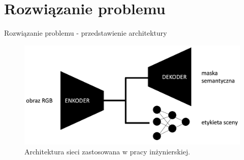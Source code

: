\documentclass[10pt]{beamer}
\begin{document}
\section*{Rozwiązanie problemu}
\begin{frame}{Rozwiązanie problemu - przedstawienie architektury}
    \begin{figure}
        \includegraphics[width=\textwidth]{images/my_arch.png}
        \caption{Architektura sieci zastosowana w pracy inżynierskiej.}
    \end{figure}
\end{frame}
\end{document}
